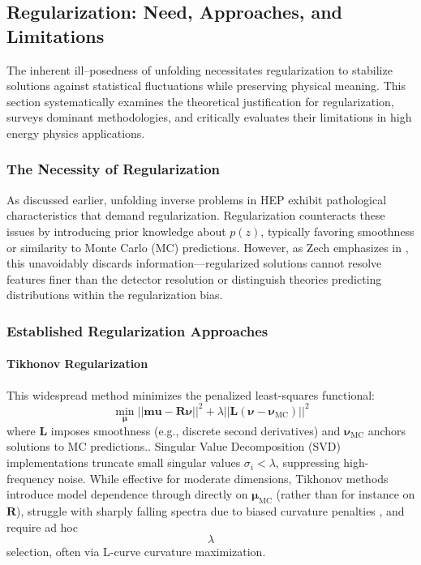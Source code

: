 \subsection{Regularization: Need, Approaches, and Limitations}  
The inherent ill--posedness of unfolding necessitates regularization to stabilize solutions against statistical fluctuations while preserving physical meaning.
%
This section systematically examines the theoretical justification for regularization, surveys dominant methodologies, and critically evaluates their limitations in high energy physics applications.

\subsubsection{The Necessity of Regularization}  
 As discussed earlier, unfolding inverse problems in HEP exhibit pathological characteristics that demand regularization.
%
Regularization counteracts these issues by introducing prior knowledge about \(p(z)\), typically favoring smoothness or similarity to Monte Carlo (MC) predictions.
%
However, as Zech emphasizes in , this unavoidably discards information---regularized solutions cannot resolve features finer than the detector resolution or distinguish theories predicting distributions within the regularization bias.

\subsubsection{Established Regularization Approaches}  

\paragraph{Tikhonov Regularization}  
This widespread method minimizes the penalized least-squares functional:  
\begin{equation}
    \min_{\boldsymbol{\mu}} ||\mathbf{mu} - \mathbf{R}\boldsymbol{\nu}||^2 + \lambda ||\mathbf{L}(\boldsymbol{\nu} - \boldsymbol{\nu}_{\text{MC}})||^2
\end{equation}  
where \(\mathbf{L}\) imposes smoothness (e.g., discrete second derivatives) and \(\boldsymbol{\nu}_{\text{MC}}\) anchors solutions to MC predictions..
%
Singular Value Decomposition (SVD) implementations truncate small singular values \(\sigma_i < \lambda\), suppressing high-frequency noise.
%
While effective for moderate dimensions, Tikhonov methods introduce model dependence through directly on \(\boldsymbol{\mu}_{\text{MC}}\) (rather than for instance on $\mathbf{R}$), struggle with sharply falling spectra due to biased curvature penalties , and require ad hoc $$\lambda$$ selection, often via L-curve curvature maximization.

